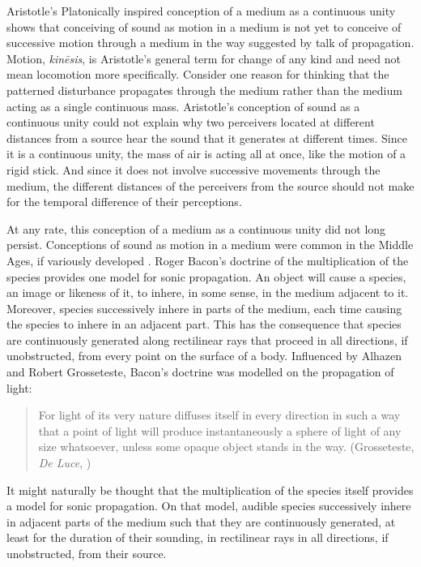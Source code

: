 Aristotle's Platonically inspired conception of a medium as a continuous unity shows that conceiving of sound as motion in a medium is not yet to conceive of successive motion through a medium in the way suggested by talk of propagation. Motion, \emph{kinēsis}, is Aristotle's general term for change of any kind and need not mean locomotion more specifically. Consider one reason for thinking that the patterned disturbance propagates through the medium rather than the medium acting as a single continuous mass. Aristotle's conception of sound as a continuous unity could not explain why two perceivers located at different distances from a source hear the sound that it generates at different times. Since it is a continuous unity, the mass of air is acting all at once, like the motion of a rigid stick. And since it does not involve successive movements through the medium, the different distances of the perceivers from the source should not make for the temporal difference of their perceptions. 

At any rate, this conception of a medium as a continuous unity did not long persist. Conceptions of sound as motion in a medium were common in the Middle Ages, if variously developed \citep{Pasnau:2000aa}. Roger Bacon's doctrine of the multiplication of the species provides one model for sonic propagation. An object will cause a species, an image or likeness of it, to inhere, in some sense, in the medium adjacent to it. Moreover, species successively inhere in parts of the medium, each time causing the species to inhere in an adjacent part. This has the consequence that species are continuously generated along rectilinear rays that proceed in all directions, if unobstructed, from every point on the surface of a body. Influenced by Alhazen and Robert Grosseteste, Bacon's doctrine was modelled on the propagation of light: 
 \begin{quote}
	For light of its very nature diffuses itself in every direction in such a way that a point of light will produce instantaneously a sphere of light of any size whatsoever, unless some opaque object stands in the way. (Grosseteste, \emph{De Luce}, \citealt[10]{Riedl:1942it})
\end{quote}
It might naturally be thought that the multiplication of the species itself provides a model for sonic propagation. On that model, audible species successively inhere in adjacent parts of the medium such that they are continuously generated, at least for the duration of their sounding, in rectilinear rays in all directions, if unobstructed, from their source. 


